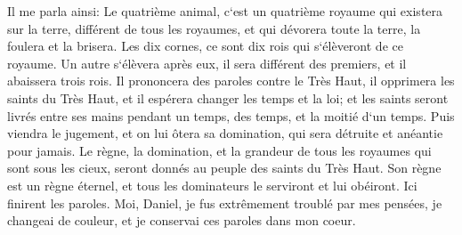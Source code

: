 \verse Il me parla ainsi: Le quatrième animal, c`est un quatrième royaume qui existera sur la terre, différent de tous les royaumes, et qui dévorera toute la terre, la foulera et la brisera. 
\verse Les dix cornes, ce sont dix rois qui s`élèveront de ce royaume. Un autre s`élèvera après eux, il sera différent des premiers, et il abaissera trois rois. 
\verse Il prononcera des paroles contre le Très Haut, il opprimera les saints du Très Haut, et il espérera changer les temps et la loi; et les saints seront livrés entre ses mains pendant un temps, des temps, et la moitié d`un temps. 
\verse Puis viendra le jugement, et on lui ôtera sa domination, qui sera détruite et anéantie pour jamais. 
\verse Le règne, la domination, et la grandeur de tous les royaumes qui sont sous les cieux, seront donnés au peuple des saints du Très Haut. Son règne est un règne éternel, et tous les dominateurs le serviront et lui obéiront. 
\verse Ici finirent les paroles. Moi, Daniel, je fus extrêmement troublé par mes pensées, je changeai de couleur, et je conservai ces paroles dans mon coeur. 

